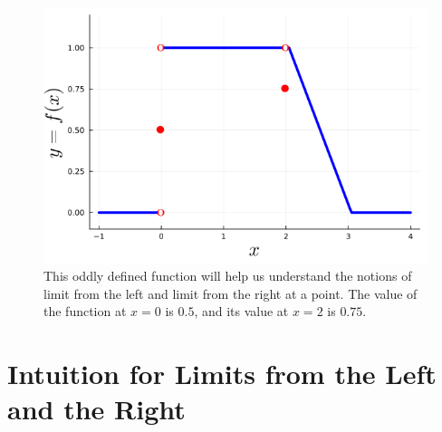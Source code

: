 \newpage


\begin{figure}[htb]%
\centering
\includegraphics[width=0.6\columnwidth]{graphics/Chap04/LeftRightLimitExample01.png}%
    \caption[]{This oddly defined function will help us understand the notions of limit from the left and limit from the right at a point. The value of the function at $x=0$ is $0.5$, and its value at $x=2$ is $0.75$.}
    \label{fig:StrangeFunctionLeftRightLimits}
\end{figure}

\section{Intuition for Limits from the Left and the Right}
\label{sec:IntuitionLeftRightLimits}

